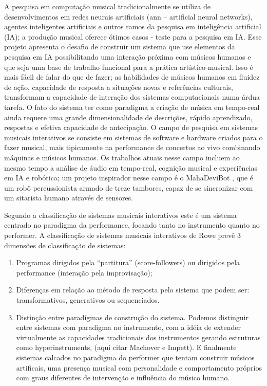 \documentclass{ppgmus}
\begin{document}
A pesquisa em computação musical tradicionalmente se utiliza de
desenvolvimentos em redes neurais artificiais (ann – artificial neural
networks), agentes inteligentes artificiais e outros ramos da pesquisa
em inteligência artificial (IA); a produção musical oferece ótimos
casos - teste para a pesquisa em IA. Esse projeto apresenta o desafio
de construir um sistema que use elementos da pesquisa em IA
possibilitando uma interação próxima com músicos humanos e que seja
uma base de trabalho funcional para a prática artístico-musical. Isso
é mais fácil de falar do que de fazer; as habilidades de músicos
humanos em fluidez de ação, capacidade de resposta a situações novas e
referências culturais, transformam a capacidade de interação dos
sistemas computacionais numa árdua tarefa. O fato do sistema ter como
paradigma a criação de música em tempo-real ainda requere uma grande
dimensionalidade de descrições, rápido aprendizado, respostas e
efetiva capacidade de antecipação. O campo de pesquisa em sistemas
musicais interativos\cite{rowe93:interactive} se consiste em sistemas de software e
hardware criados para o fazer musical, mais tipicamente na performance
de concertos ao vivo combinando máquinas e músicos humanos. Os
trabalhos atuais nesse campo incluem ao mesmo tempo a análise de áudio
em tempo-real, cognição musical e experiências em IA e robótica; um
projeto inspirador nesse campo é o MahaDeviBot \cite{kapur07:integrating}, que
é um robô percussionista armado de treze tambores, capaz de se
sincronizar com um sitarista humano através de sensores.

Segundo a classificação de sistemas musicais interativos \cite{rowe93:interactive}
este é um sistema centrado no paradigma da performance, focando tanto
no instrumento quanto no performer. A classificação de sistemas
musicais interativos de Rowe prevê 3 dimensões de classificação de
sistemas:

\begin{enumerate}
\item Programas dirigidos pela ``partitura'' (score-followers) ou
  dirigidos pela performance (interação pela improvisação);
\item Diferenças em relação ao método de resposta pelo sistema que
  podem ser: transformativos, generativos ou sequenciados.
\item Distinção entre paradigmas de construção do sistema. Podemos
  distinguir entre sistemas com paradigma no instrumento, com a idéia
  de extender virtualmente as capacidades tradicionais dos
  instrumentos gerando estruturas como hyperinstruments, (aqui citar
  Machover e Impett). E finalmente sistemas calcados no paradigma do
  performer que tentam construir músicos artificais, uma presença
  musical com personalidade e comportamento próprios com graus
  diferentes de intervenção e influência do músico humano.
\end{enumerate}
\end{document}
